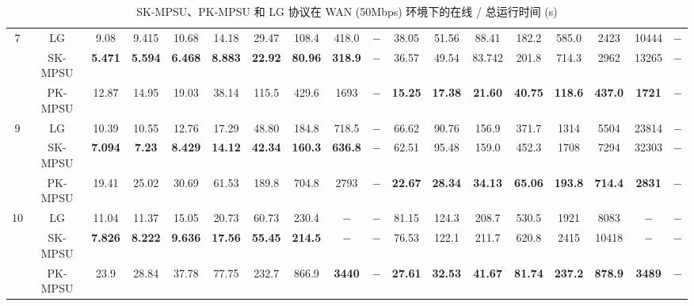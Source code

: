 \begin{table}[p]
\begin{adjustbox}{angle=90,center,scale=0.85}
\begin{tabular}{|c|c|*{16}{c|}}
\multirow{3}{*}{7} 
 & LG & 9.08 & 9.415 & 10.68 & 14.18 & 29.47 & 108.4 & 418.0 & $-$ & 38.05 & 51.56 & 88.41 & 182.2 & 585.0 & 2423 & 10444 & $-$ \\ \cline{2-18} 
 & SK-MPSU & \textbf{5.471} & \textbf{5.594} & \textbf{6.468} & \textbf{8.883} & \textbf{22.92} & \textbf{80.96} & \textbf{318.9} & $-$ & 36.57 & 49.54 & 83.742 & 201.8 & 714.3 & 2962 & 13265 & $-$ \\ \cline{2-18} 
 & PK-MPSU & 12.87 & 14.95 & 19.03 & 38.14 & 115.5 & 429.6 & 1693 & $-$ & \textbf{15.25} & \textbf{17.38} & \textbf{21.60} & \textbf{40.75} & \textbf{118.6} & \textbf{437.0} & \textbf{1721} & $-$ \\ \hline

\multirow{3}{*}{9} 
 & LG & 10.39 & 10.55 & 12.76 & 17.29 & 48.80 & 184.8 & 718.5 & $-$ & 66.62 & 90.76 & 156.9 & 371.7 & 1314 & 5504 & 23814 & $-$ \\ \cline{2-18} 
 & SK-MPSU & \textbf{7.094} & \textbf{7.23} & \textbf{8.429} & \textbf{14.12} & \textbf{42.34} & \textbf{160.3} & \textbf{636.8} & $-$ & 62.51 & 95.48 & 159.0 & 452.3 & 1708 & 7294 & 32303 & $-$ \\ \cline{2-18} 
 & PK-MPSU & 19.41 & 25.02 & 30.69 & 61.53 & 189.8 & 704.8 & 2793 & $-$ & \textbf{22.67} & \textbf{28.34} & \textbf{34.13} & \textbf{65.06} & \textbf{193.8} & \textbf{714.4} & \textbf{2831} & $-$ \\ \hline

\multirow{3}{*}{10} 
 & LG & 11.04 & 11.37 & 15.05 & 20.73 & 60.73 & 230.4 & $-$ & $-$ & 81.15 & 124.3 & 208.7 & 530.5 & 1921 & 8083 & $-$ & $-$ \\ \cline{2-18} 
 & SK-MPSU & \textbf{7.826} & \textbf{8.222} & \textbf{9.636} & \textbf{17.56} & \textbf{55.45} & \textbf{214.5} & $-$ & $-$ & 76.53 & 122.1 & 211.7 & 620.8 & 2415 & 10418 & $-$ & $-$ \\ \cline{2-18} 
 & PK-MPSU & 23.9 & 28.84 & 37.78 & 77.75 & 232.7 & 866.9 & \textbf{3440} & $-$ & \textbf{27.61} & \textbf{32.53} & \textbf{41.67} & \textbf{81.74} & \textbf{237.2} & \textbf{878.9} & \textbf{3489} & $-$ \\ \hline 
\end{tabular}%
\end{adjustbox}

\vspace*{\fill}
\caption{SK-MPSU、PK-MPSU 和 LG 协议在 WAN (50Mbps) 环境下的在线 / 总运行时间 (s)}
\label{tab:time_50mbps}
\end{table}


